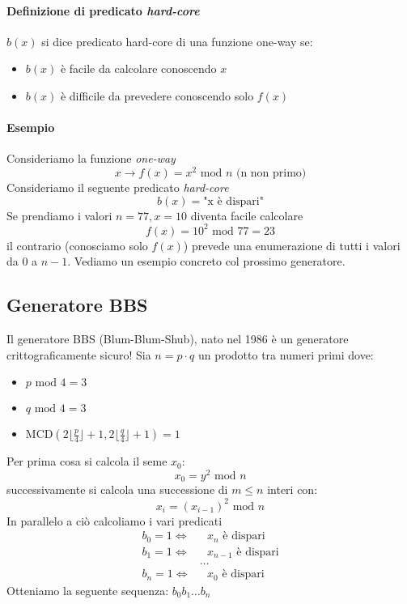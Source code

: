 \paragraph{Definizione di predicato \emph{hard-core}} $b(x)$ si dice predicato hard-core di una funzione one-way se:
\begin{itemize}
    \item $b(x)$ è facile da calcolare conoscendo $x$
    \item $b(x)$ è difficile da prevedere conoscendo solo $f(x)$
\end{itemize}
\paragraph{Esempio} Consideriamo la funzione \emph{one-way}
$$ x \xrightarrow{} f(x) = x^2 \text{ mod } n \text{ (n non primo)} $$
Consideriamo il seguente predicato \emph{hard-core}
$$ b(x) = \text{"x è dispari"} $$
Se prendiamo i valori $n = 77, x = 10$ diventa facile calcolare 
$$f(x) = 10^{2} \text{ mod } 77 = 23$$
il contrario (conosciamo solo $f(x)$) prevede una enumerazione di tutti i valori da 0 a $n-1$. Vediamo un esempio concreto col prossimo generatore.

\subsection{Generatore BBS}
Il generatore BBS (Blum-Blum-Shub), nato nel 1986 è un generatore crittograficamente sicuro! Sia $n=p \cdot q $ un prodotto tra numeri primi dove:
\begin{itemize}
    \item $ p \text{ mod } 4 = 3 $
    \item $ q \text{ mod } 4 = 3 $
    \item $ \text{MCD}\left(2 \lfloor \frac{p}{4} \rfloor + 1, 2 \lfloor \frac{q}{4} \rfloor + 1\right) = 1$
\end{itemize}
Per prima cosa si calcola il seme $x_{0}$:
$$ x_{0} = y^{2} \text{ mod } n $$
successivamente si calcola una successione di $ m \leq n $ interi con:
$$ x_{i} = (x_{i-1})^{2} \text{ mod } n $$
In parallelo a ciò calcoliamo i vari predicati
\begin{align*}
	b_{0} = 1   \Longleftrightarrow  &  \text{ } x_{n}  \text{ è dispari}\\
	b_{1} = 1   \Longleftrightarrow  &   \text{ }  x_{n-1}  \text{ è dispari}\\
 & \dots \\
	b_{n} = 1   \Longleftrightarrow  &  \text{ }  x_{0}  \text{ è dispari}
\end{align*}
Otteniamo la seguente sequenza: $b_0b_1 \dots b_n$
